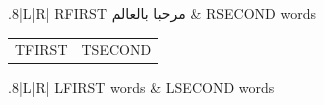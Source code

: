 \documentclass{article}
\begin{document}
\begin{RTL}
\noindent\begin{tabulary}{.8\linewidth}{|L|R|}
RFIRST \foreignlanguage{arabic}{مرحبا بالعالم} & RSECOND words \\
\end{tabulary}
\par
\noindent\begin{tabular}{|l|r|}TFIRST & TSECOND\end{tabular}
\end{RTL}
\begin{LTR}
\noindent\begin{tabulary}{.8\linewidth}{|L|R|}
LFIRST words & LSECOND words \\
\end{tabulary}
\end{LTR}
\end{document}

